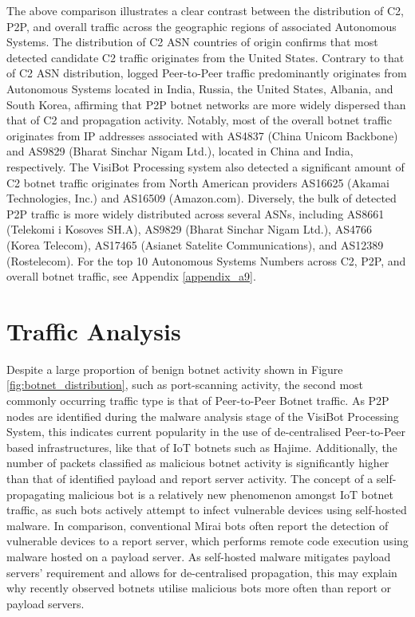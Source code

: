 The above comparison illustrates a clear contrast between the distribution of C2, P2P, and overall traffic across the geographic regions of associated Autonomous Systems. The distribution of C2 ASN countries of origin confirms that most detected candidate C2 traffic originates from the United States. Contrary to that of C2 ASN distribution, logged Peer-to-Peer traffic predominantly originates from Autonomous Systems located in India, Russia, the United States, Albania, and South Korea, affirming that P2P botnet networks are more widely dispersed than that of C2 and propagation activity. Notably, most of the overall botnet traffic originates from IP addresses associated with AS4837 (China Unicom Backbone) and AS9829 (Bharat Sinchar Nigam Ltd.), located in China and India, respectively. The VisiBot Processing system also detected a significant amount of C2 botnet traffic originates from North American providers AS16625 (Akamai Technologies, Inc.) and AS16509 (Amazon.com). Diversely, the bulk of detected P2P traffic is more widely distributed across several ASNs, including AS8661 (Telekomi i Kosoves SH.A), AS9829 (Bharat Sinchar Nigam Ltd.), AS4766 (Korea Telecom), AS17465 (Asianet Satelite Communications), and AS12389 (Rostelecom). For the top 10 Autonomous Systems Numbers across C2, P2P, and overall botnet traffic, see Appendix \ref{appendix_a9}. 






















\section{Traffic Analysis}

Despite a large proportion of benign botnet activity shown in Figure \ref{fig:botnet_distribution}, such as port-scanning activity, the second most commonly occurring traffic type is that of Peer-to-Peer Botnet traffic. As P2P nodes are identified during the malware analysis stage of the VisiBot Processing System, this indicates current popularity in the use of de-centralised Peer-to-Peer based infrastructures, like that of IoT botnets such as Hajime. Additionally, the number of packets classified as malicious botnet activity is significantly higher than that of identified payload and report server activity. The concept of a self-propagating malicious bot is a relatively new phenomenon amongst IoT botnet traffic, as such bots actively attempt to infect vulnerable devices using self-hosted malware. In comparison, conventional Mirai bots often report the detection of vulnerable devices to a report server, which performs remote code execution using malware hosted on a payload server. As self-hosted malware mitigates payload servers' requirement and allows for de-centralised propagation, this may explain why recently observed botnets utilise malicious bots more often than report or payload servers. 

